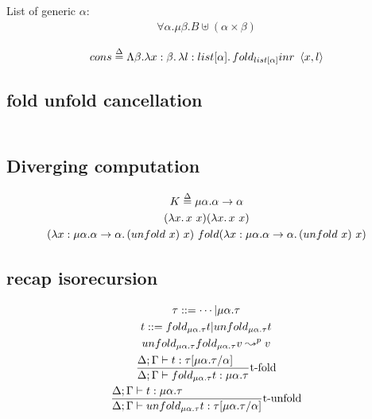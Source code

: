 \documentclass{article}
\newcommand{\st}[3][]{\ensuremath \displaystyle\frac{#3\hfill}{#2\hfill} \text{#1}}
\begin{document}
List of generic $\alpha$:
\begin{align*}
    \forall\alpha.\mu\beta.B\uplus(\alpha\times\beta)
\end{align*}


\begin{align*}
    cons \overset\Delta= \Lambda\beta.\lambda x:\beta\ldotp \lambda l:list[\alpha]\ldotp fold_{list[\alpha]}{inr}~\left\langle x, l\right\rangle
\end{align*}

\subsection{fold unfold cancellation}
\begin{gather*}
\end{gather*}

\subsection{Diverging computation}
\begin{gather*}
    K \overset\Delta= \mu\alpha.\alpha\to\alpha \\
    (\lam{x}{x\ x})(\lam{x}{x\ x}) \\
    (\lam{x:\mu\alpha.\alpha\to\alpha}{(unfold\ x)\ x})\ fold(\lam{x:\mu\alpha.\alpha\to\alpha}{(unfold\ x)\ x})
\end{gather*}

\subsection{recap isorecursion}
\begin{gather*}
    \tau ::= \cdots | \mu\alpha.\tau \\
    t ::= fold_{\mu\alpha.\tau}t | unfold_{\mu\alpha.\tau}t \\
    unfold_{\mu\alpha.\tau}fold_{\mu\alpha.\tau}v\leadsto^p v \\
    \st[t-fold]{
        \Delta;\Gamma\vdash fold_{\mu\alpha.\tau} t : \mu\alpha.\tau
    }{
        \Delta;\Gamma\vdash t:\tau[\mu\alpha.\tau/\alpha]
    } \\
    \st[t-unfold]{
        \Delta;\Gamma\vdash unfold_{\mu\alpha.\tau}t:\tau[\mu\alpha.\tau/\alpha]
    }{
        \Delta;\Gamma\vdash t:\mu\alpha.\tau
    } \\
\end{gather*}
\end{document}
